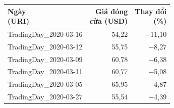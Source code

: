 \begin{tabular}{lrr}
\toprule
\makecell[l]{Ngày\\(URI)} & \makecell[r]{Giá đóng\\cửa (USD)} & \makecell[r]{Thay đổi\\(\%)} \\
\midrule
TradingDay\_2020-03-16 & 54{,}22 & \ensuremath{-}11{,}10 \\
TradingDay\_2020-03-12 & 55{,}75 & \ensuremath{-}8{,}27 \\
TradingDay\_2020-03-09 & 60{,}78 & \ensuremath{-}6{,}38 \\
TradingDay\_2020-03-11 & 60{,}77 & \ensuremath{-}5{,}08 \\
TradingDay\_2020-03-05 & 65{,}95 & \ensuremath{-}4{,}87 \\
TradingDay\_2020-03-27 & 55{,}54 & \ensuremath{-}4{,}39 \\
\bottomrule
\end{tabular}
